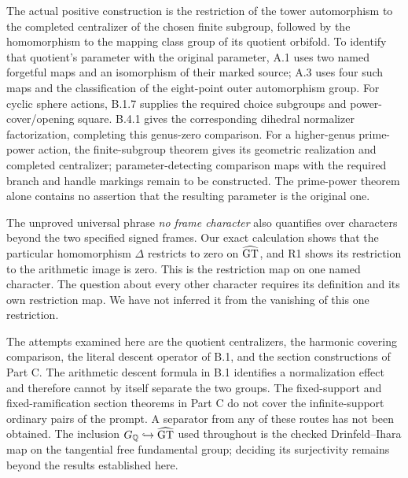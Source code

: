 The actual positive construction is the restriction of
the tower automorphism to the completed centralizer of
the chosen finite subgroup, followed by the homomorphism
to the mapping class group of its quotient orbifold.
To identify that quotient's parameter with the original
parameter, A.1 uses two named forgetful maps and
an isomorphism of their marked source; A.3 uses four
such maps and the classification of the eight-point
outer automorphism group. For cyclic sphere actions,
B.1.7 supplies the required choice subgroups and
power-cover/opening square. B.4.1 gives the corresponding
dihedral normalizer factorization, completing this
genus-zero comparison. For a higher-genus prime-power
action, the finite-subgroup theorem gives its geometric
realization and completed centralizer; parameter-detecting
comparison maps with the required branch and handle
markings remain to be constructed. The prime-power
theorem alone contains no assertion that the resulting
parameter is the original one.

The unproved universal phrase \emph{no frame character}
also quantifies over characters beyond the two
specified signed frames. Our exact calculation shows
that the particular homomorphism $\Delta$ restricts to
zero on $\widehat{\mathrm{GT}}$, and R1 shows its restriction to the
arithmetic image is zero. This is the restriction
map on one named character. The question about every
other character requires its definition and its own
restriction map. We have not inferred it from the
vanishing of this one restriction.

The attempts examined here are the quotient centralizers,
the harmonic covering comparison, the literal descent
operator of B.1, and the section constructions of
Part C. The arithmetic descent formula in B.1
identifies a normalization effect and therefore cannot
by itself separate the two groups. The fixed-support
and fixed-ramification section theorems in Part C
do not cover the infinite-support ordinary pairs
of the prompt. A separator from any of these routes
has not been obtained. The inclusion
$G_{\mathbb Q}\hookrightarrow\widehat{\mathrm{GT}}$ used throughout is
the checked Drinfeld--Ihara map on the tangential
free fundamental group; deciding its surjectivity
remains beyond the results established here.
